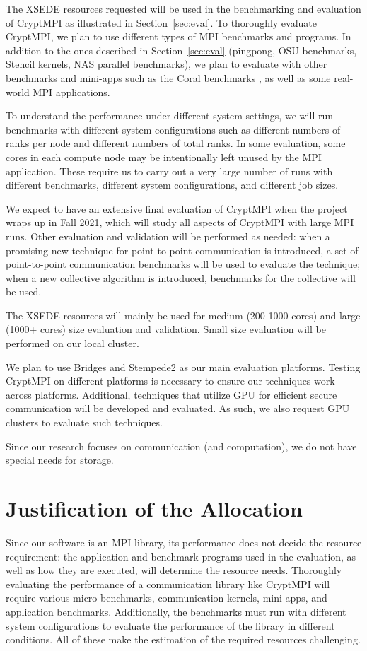 {The XSEDE resources requested will be used in the benchmarking and evaluation
of CryptMPI as illustrated in Section~\ref{sec:eval}. To thoroughly evaluate CryptMPI,
we plan to use different types of MPI benchmarks and programs. In addition to the ones
described in Section~\ref{sec:eval} (pingpong, OSU benchmarks, Stencil kernels,
NAS parallel benchmarks), we plan to evaluate with other benchmarks and mini-apps
such as the Coral benchmarks \cite{CORAL}, as well as some real-world MPI applications. 

To understand the performance under different system settings,
we will run benchmarks with different system configurations such as different numbers of ranks per node
and different numbers of total ranks. In some evaluation, some cores in each compute node may be
intentionally left unused by the MPI application. These require us to carry out
a very large number of runs with different benchmarks, different system configurations,
and different job sizes.

We expect to have an extensive final evaluation of CryptMPI when the project wraps up in Fall 2021, which
will study all aspects of CryptMPI with large MPI runs. Other evaluation and validation
will be performed as needed: when a promising new technique for point-to-point communication
is introduced, a set of point-to-point communication benchmarks will be used to evaluate
the technique; when a new collective algorithm is introduced, benchmarks for the
collective will be used.

The XSEDE resources will mainly be used for medium (200-1000 cores)
and large (1000+ cores) size evaluation and validation. Small size evaluation
will be performed on our local cluster. 

We plan to use Bridges and Stempede2 as our main evaluation platforms. Testing CryptMPI on
different platforms is necessary to ensure our techniques work across platforms. 
Additional, techniques that utilize GPU for efficient secure communication will be developed
and evaluated. As such, we also request GPU clusters to evaluate such techniques. 

Since our research focuses on communication (and computation), we do not have special
needs for storage. 

\section{Justification of the Allocation}

Since our software is an MPI library, its performance does not decide the resource requirement:
the application and benchmark programs used in the evaluation, as well as how they are executed,
will determine the resource needs. Thoroughly evaluating the performance of a
communication library like CryptMPI will require various micro-benchmarks, communication
kernels, mini-apps, and application benchmarks. Additionally, the benchmarks must run with
different system configurations to evaluate the performance of the library in different conditions.
All of these make the estimation of the required resources challenging.

}

